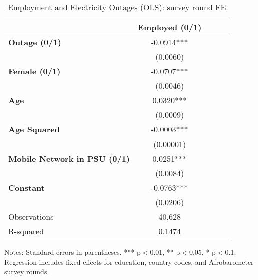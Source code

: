 \documentclass{article}
\begin{document}
\newpage
\clearpage
\begin{table}[htbp]
\centering
\caption{Employment and Electricity Outages (OLS): survey round FE}
\label{tab:employment_outages}
\begin{threeparttable}
\begin{tabular}{lcccc}
\toprule
 & \textbf{Employed (0/1)} \\ 
\midrule
\textbf{Outage (0/1)} & -0.0914*** &  \\ 
 & (0.0060) \\ 
\textbf{Female (0/1)} & -0.0707*** & \\ 
 & (0.0046) \\ 
\textbf{Age} & 0.0320*** &  \\ 
 & (0.0009) \\ 
\textbf{Age Squared} & -0.0003*** & \\ 
 & (0.00001) \\ 
\textbf{Mobile Network in PSU (0/1)} & 0.0251*** &  \\ 
 & (0.0084) \\ 
\textbf{Constant} & -0.0763*** & \\ 
 & (0.0206) \\ 
\midrule
Observations & 40,628 \\
R-squared & 0.1474 \\
\bottomrule
\end{tabular}
\begin{tablenotes}
\footnotesize
\item Notes: Standard errors in parentheses. *** p$<$0.01, ** p$<$0.05, * p$<$0.1. Regression includes fixed effects for education, country codes, and Afrobarometer survey rounds.
\end{tablenotes}
\end{threeparttable}
\end{table}
\end{document}
